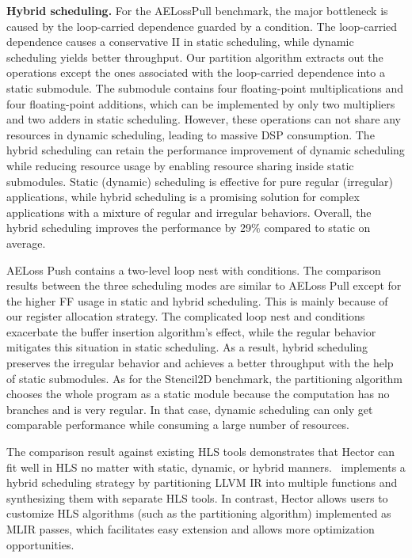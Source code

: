 \textbf{Hybrid scheduling.} For the AELossPull benchmark, the major bottleneck is caused by the loop-carried dependence guarded by a condition. The loop-carried dependence causes a conservative II in static scheduling, while dynamic scheduling yields better throughput. Our partition algorithm extracts out the operations except the ones associated with the loop-carried dependence into a static submodule. The submodule contains four floating-point multiplications and four floating-point additions, which can be implemented by only two multipliers and two adders in static scheduling. However, these operations can not share any resources in dynamic scheduling, leading to massive DSP consumption. The hybrid scheduling can retain the performance improvement of dynamic scheduling while reducing resource usage by enabling resource sharing inside static submodules. Static (dynamic) scheduling is effective for pure regular (irregular) applications, while hybrid scheduling is a promising solution for complex applications with a mixture of regular and irregular behaviors. Overall, the hybrid scheduling improves the performance by 29$\%$ compared to static on average. 

AELoss Push contains a two-level loop nest with conditions. The comparison results between the three scheduling modes are similar to AELoss Pull except for the higher FF usage in static and hybrid scheduling. This is mainly because of our register allocation strategy. The complicated loop nest and conditions exacerbate the buffer insertion algorithm's effect, while the regular behavior mitigates this situation in static scheduling. As a result, hybrid scheduling preserves the irregular behavior and achieves a better throughput with the help of static submodules. As for the Stencil2D benchmark, the partitioning algorithm chooses the whole program as a static module because the computation has no branches and is very regular. In that case, dynamic scheduling can only get comparable performance while consuming a large number of resources.

The comparison result against existing HLS tools demonstrates that Hector can fit well in HLS no matter with static, dynamic, or hybrid manners.~\cite{find_islands} implements a hybrid scheduling strategy by partitioning LLVM IR into multiple functions and synthesizing them with separate HLS tools. In contrast, Hector allows users to customize HLS algorithms (such as the partitioning algorithm) implemented as MLIR passes, which facilitates easy extension and allows more optimization opportunities.

